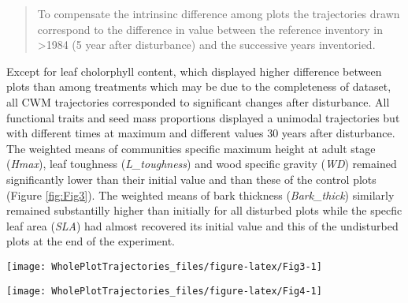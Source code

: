 \documentclass[fleqn,10pt]{ArtEcoFoG} %
\theoremstyle{definition}
\theoremstyle{definition}
\theoremstyle{definition}
\theoremstyle{remark}
\begin{document}
\begin{quote}
To compensate the intrinsinc difference among plots the trajectories
drawn correspond to the difference in value between the reference
inventory in \textgreater{}1984 (5 year after disturbance) and the
successive years inventoried.
\end{quote}

Except for leaf cholorphyll content, which displayed higher difference
between plots than among treatments which may be due to the completeness
of dataset, all CWM trajectories corresponded to significant changes
after disturbance. All functional traits and seed mass proportions
displayed a unimodal trajectories but with different times at maximum
and different values 30 years after disturbance. The weighted means of
communities specific maximum height at adult stage (\emph{Hmax}), leaf
toughness (\emph{L\_toughness}) and wood specific gravity (\emph{WD})
remained significantly lower than their initial value and than these of
the control plots (Figure \ref{fig:Fig3}). The weighted means of bark
thickness (\emph{Bark\_thick}) similarly remained substantilly higher
than initially for all disturbed plots while the specfic leaf area
(\emph{SLA}) had almost recovered its initial value and this of the
undisturbed plots at the end of the experiment.

\begin{figure*}

{\centering \texttt{[image: WholePlotTrajectories\_files/figure-latex/Fig3-1]} 

}

\caption{Trajectories of the communities weighted means (CWM) over 30 years after disturbance of 4 leaf traits (Leaf thickness, *L_thickness*, chlorophyll content, *L_chloro*, toughness, *L_toughness* and specific area, *SLA*), 2 stem traits (wood specific gravity, *WD*, and bark thickness, *Bark-thick*) and one life trait (Specific maximum height at adult stage,*Hmax*). Trajectories correspond to the median (solid line) and 0.025 and 0.975 percentile (gray envelope) observed after 50 iteration of the taxonomic uncertainty propagation and the missing trait value filling processes. Initial treatments are represented by solid lines colorswith green for control, blue for T1,orange for T2 and red for T3.}\label{fig:Fig3}
\end{figure*}

\begin{figure*}

{\centering \texttt{[image: WholePlotTrajectories\_files/figure-latex/Fig4-1]} 

}

\caption{Trajectories of seed mass classes proportions over 30 years after disturbance, corresponding to the median (solid line) and 0.025 and 0.975 percentile (gray envelope) observed after 50 iteration of the taxonomic uncertainty propagation. No gap filling process was applied in this case. Initial treatments are represented by solid lines colors with green for control, blue for T1,orange for T2 and red for T3.}\label{fig:Fig4}
\end{figure*}
\end{document}
